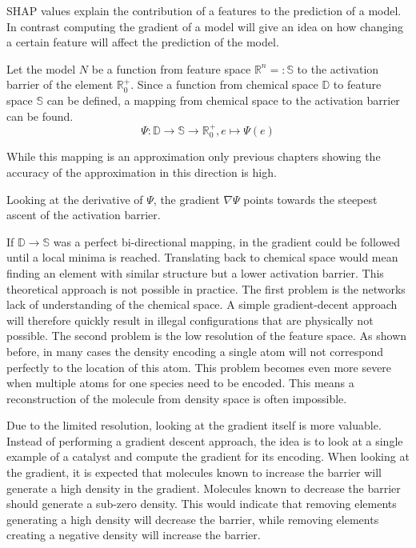 SHAP values explain the contribution of a features to the prediction of a model.
In contrast computing the gradient of a model will give an idea on how changing a certain feature will affect the prediction of the model.

Let the model $N$ be a function from feature space $\mathbb{R}^n =: \mathbb{S}$ to the activation barrier of the element $\mathbb{R}^+_0$.
Since a function from chemical space $\mathbb{D}$ to feature space $\mathbb{S}$ can be defined,
a mapping from chemical space to the activation barrier can be found.
$$ \Psi : \mathbb{D} \to \mathbb{S} \to \mathbb{R}^+_0, e \mapsto \Psi(e) $$

While this mapping is an approximation only previous chapters showing 
the accuracy of the approximation in this direction is high.

Looking at the derivative of $\Psi$, the gradient $\nabla \Psi$ points towards the steepest ascent of the activation barrier.

If $\mathbb{D} \to \mathbb{S}$ was a perfect bi-directional mapping, in the gradient could be followed until a local minima is reached.
Translating back to chemical space would mean finding an element with similar structure but a lower activation barrier.
This theoretical approach is not possible in practice.
The first problem is the networks lack of understanding of the chemical space.
A simple gradient-decent approach will therefore quickly result in illegal configurations 
that are physically not possible.
The second problem is the low resolution of the feature space.
As shown before, in many cases the density encoding a single atom will not correspond perfectly to the location of this atom.
This problem becomes even more severe when multiple atoms for one species need to be encoded.
This means a reconstruction of the molecule from density space is often impossible.

Due to the limited resolution, looking at the gradient itself is more valuable.
Instead of performing a gradient descent approach, the idea is to look at a single example of a catalyst and compute the gradient for its encoding.
When looking at the gradient, it is expected that molecules known to increase the barrier will generate a high density in the gradient.
Molecules known to decrease the barrier should generate a sub-zero density.
This would indicate that removing elements generating a high density will decrease the barrier,
while removing elements creating a negative density will increase the barrier. %

